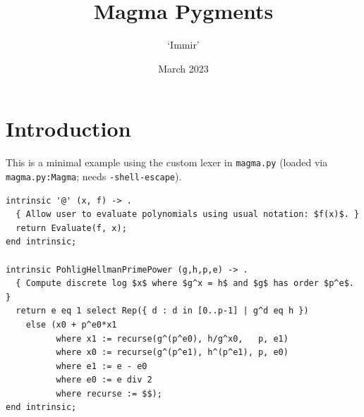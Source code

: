 \documentclass{article}
\title{Magma Pygments}
\author{`Immir'}
\date{March 2023}
\begin{document}
\maketitle

\section*{Introduction}

This is a minimal example using the custom lexer in \texttt{magma.py}
(loaded via \texttt{magma.py:Magma}; needs \texttt{-shell-escape}).

\begin{verbatim}
intrinsic '@' (x, f) -> .
  { Allow user to evaluate polynomials using usual notation: $f(x)$. }
  return Evaluate(f, x);
end intrinsic;

intrinsic PohligHellmanPrimePower (g,h,p,e) -> .
  { Compute discrete log $x$ where $g^x = h$ and $g$ has order $p^e$. }
  return e eq 1 select Rep({ d : d in [0..p-1] | g^d eq h })
    else (x0 + p^e0*x1
          where x1 := recurse(g^(p^e0), h/g^x0,   p, e1)
          where x0 := recurse(g^(p^e1), h^(p^e1), p, e0)
          where e1 := e - e0
          where e0 := e div 2
          where recurse := $$);
end intrinsic;
\end{verbatim}
\end{document}
